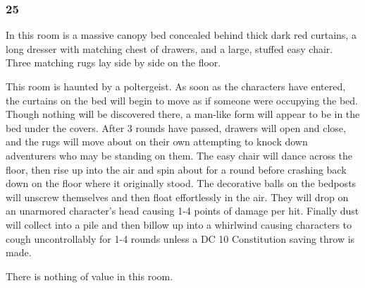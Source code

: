 \documentclass[palace_of_the_silver_princess]{subfiles}
\begin{document}
\subsubsection{25}
\begin{quotebox}
    In this room is a massive canopy bed concealed behind thick dark red
    curtains, a long dresser with matching chest of drawers, and a
    large, stuffed easy chair. Three matching rugs lay side by side on
    the floor.
\end{quotebox}

This room is haunted by a poltergeist.  As soon as the characters have
entered, the curtains on the bed will begin to move as if someone were
occupying the bed. Though nothing will be discovered there, a man-like
form will appear to be in the bed under the covers. After 3 rounds have
passed, drawers will open and close, and the rugs will move about on
their own attempting to knock down adventurers who may be standing on
them. The easy chair will dance across the floor, then rise up into the
air and spin about for a round before crashing back down on the floor
where it originally stood. The decorative balls on the bedposts will
unscrew themselves and then float effortlessly in the air. They will
drop on an unarmored character’s head causing 1-4 points of damage per
hit. Finally dust will collect into a pile and then billow up into a
whirlwind causing characters to cough uncontrollably for 1-4 rounds
unless a DC 10 Constitution saving throw is made.

There is nothing of value in this room.
\end{document}
